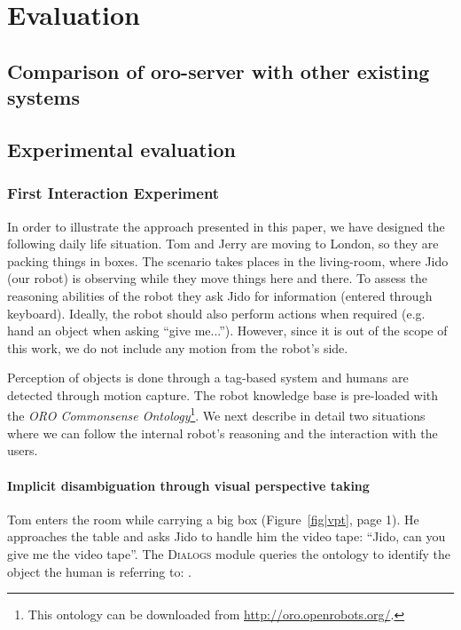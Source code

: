 \chapter{Evaluation}
\label{chapter|evaluation}

\section{Comparison of oro-server with other existing systems}
\label{sect|evaluation-oroserver}

\section{Experimental evaluation}
\label{sect|experimental-evaluation}


\subsection{First Interaction Experiment}
\label{sect|expe1}

In order to illustrate the approach presented in this paper, we have designed
the following daily life situation. Tom and Jerry are moving to London, so they
are packing things in boxes. The scenario takes places in the living-room,
where Jido (our robot) is observing while they move things here and there. To
assess the reasoning abilities of the robot they ask Jido for information
(entered through keyboard). Ideally, the robot should also perform actions when
required (e.g. hand an object when asking ``give me...''). However, since it is
out of the scope of this work, we do not include any motion from the robot's
side.

Perception of objects is done through a tag-based system and humans are
detected through motion capture. The robot knowledge base is pre-loaded with
the \emph{ORO Commonsense Ontology}\footnote{This ontology can be downloaded
from \url{http://oro.openrobots.org/}.}.  We next describe in detail two
situations where we can follow the internal robot's reasoning and the
interaction with the users.

\subsubsection{Implicit disambiguation through visual perspective taking}

Tom enters the room while carrying a big box (Figure~\ref{fig|vpt}, page 1). He
approaches the table and asks Jido to handle him the video tape: ``Jido, can
you give me the video tape''. The \textsc{Dialogs} module queries the ontology to
identify the object the human is referring to: . 

